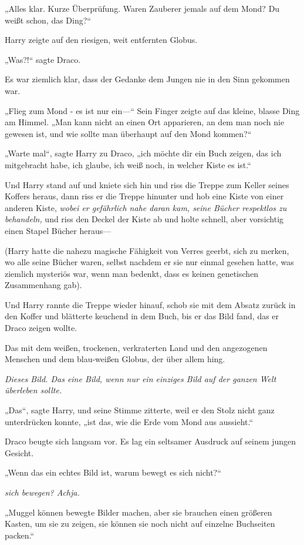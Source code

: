 {„Alles klar. Kurze Überprüfung. Waren Zauberer jemals auf dem Mond? Du weißt schon, das Ding?“

Harry zeigte auf den riesigen, weit entfernten Globus.

„Was?!“ sagte Draco.

Es war ziemlich klar, dass der Gedanke dem Jungen nie in den Sinn gekommen war.

„Flieg zum Mond - es ist nur ein—“ Sein Finger zeigte auf das kleine, blasse Ding am Himmel. „Man kann nicht an einen Ort apparieren, an dem man noch nie gewesen ist, und wie sollte man überhaupt auf den Mond kommen?“

„Warte mal“, sagte Harry zu Draco, „ich möchte dir ein Buch zeigen, das ich mitgebracht habe, ich glaube, ich weiß noch, in welcher Kiste es ist.“

Und Harry stand auf und kniete sich hin und riss die Treppe zum Keller seines Koffers heraus, dann riss er die Treppe hinunter und hob eine Kiste von einer anderen Kiste, \emph{wobei er gefährlich nahe daran kam, seine Bücher respektlos zu behandeln,} und riss den Deckel der Kiste ab und holte schnell, aber vorsichtig einen Stapel Bücher heraus—

(Harry hatte die nahezu magische Fähigkeit von Verres geerbt, sich zu merken, wo alle seine Bücher waren, selbst nachdem er sie nur einmal gesehen hatte, was ziemlich mysteriös war, wenn man bedenkt, dass es keinen genetischen Zusammenhang gab).

Und Harry rannte die Treppe wieder hinauf, schob sie mit dem Absatz zurück in den Koffer und blätterte keuchend in dem Buch, bis er das Bild fand, das er Draco zeigen wollte.

Das mit dem weißen, trockenen, verkraterten Land und den angezogenen Menschen und dem blau-weißen Globus, der über allem hing.

\emph{Dieses Bild. Das eine Bild, wenn nur ein einziges Bild auf der ganzen Welt überleben sollte.}

„Das“, sagte Harry, und seine Stimme zitterte, weil er den Stolz nicht ganz unterdrücken konnte, „ist das, wie die Erde vom Mond aus aussieht.“

Draco beugte sich langsam vor. Es lag ein seltsamer Ausdruck auf seinem jungen Gesicht.

„Wenn das ein echtes Bild ist, warum bewegt es sich nicht?“

\emph{sich bewegen? Achja.}

„Muggel können bewegte Bilder machen, aber sie brauchen einen größeren Kasten, um sie zu zeigen, sie können sie noch nicht auf einzelne Buchseiten packen.“

}
